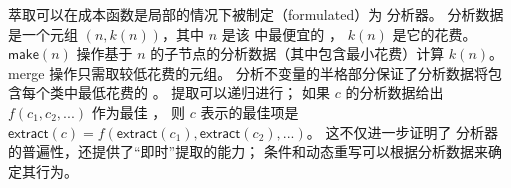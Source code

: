 萃取可以在成本函数是局部的情况下被制定（formulated）为 \eclass 分析器。 %
分析数据是一个元组 $(n, k(n))$，其中 $n$ 是该 \eclass 中最便宜的 \enode，
  $k(n)$ 是它的花费。
$\textsf{make}(n)$ 操作基于 $n$ 的子节点的分析数据（其中包含最小花费）计算 $k(n)$。
\textsf{merge} 操作只需取较低花费的元组。
分析不变量的半格部分保证了分析数据将包含每个类中最低花费的 \enode。
提取可以递归进行；
  如果 \eclass $c$ 的分析数据给出 $f(c_{1}, c_{2}, ...)$ 作为最佳 \enode，
  则 $c$ 表示的最佳项是  
  $\textsf{extract}(c) = f( \textsf{extract}(c_{1}), \textsf{extract}(c_{2}), ... )$。
这不仅进一步证明了 \eclass 分析器的普遍性，还提供了“即时”提取的能力；
  条件和动态重写可以根据分析数据来确定其行为。

